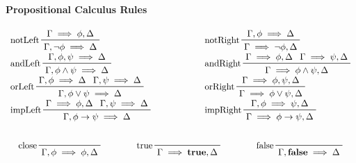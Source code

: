 \documentclass[a4paper, 11pt, accentcolor = tud3b]{tudreport}
\newcommand{\true}{\textbf{true}}
\newcommand{\false}{\textbf{false}}
\begin{document}
				\paragraph{Propositional Calculus Rules}
					\begin{gather*}
						\begin{array}{lcl}
							\prftree[l]{notLeft}{\Gamma \implies \phi, \Delta}{\Gamma, \lnot\phi \implies \Delta} &\quad\quad\quad\quad& \prftree[l]{notRight}{\Gamma, \phi \implies \Delta}{\Gamma \implies \lnot\phi, \Delta} \\
							\prftree[l]{andLeft}{\Gamma, \phi, \psi \implies \Delta}{\Gamma, \phi \land \psi \implies \Delta} && \prftree[l]{andRight}{\Gamma \implies \phi, \Delta}{\Gamma \implies \psi, \Delta}{\Gamma \implies \phi \land \psi, \Delta} \\
							\prftree[l]{orLeft}{\Gamma, \phi \implies \Delta}{\Gamma, \psi \implies \Delta}{\Gamma, \phi \lor \psi \implies \Delta} && \prftree[l]{orRight}{\Gamma \implies \phi, \psi, \Delta}{\Gamma \implies \phi \lor \psi, \Delta} \\
							\prftree[l]{impLeft}{\Gamma \implies \phi, \Delta}{\Gamma, \psi \implies \Delta}{\Gamma, \phi \to \psi \implies \Delta} && \prftree[l]{impRight}{\Gamma, \phi \implies \psi, \Delta}{\Gamma \implies \phi \to \psi, \Delta}
						\end{array} \\\\
						\prftree[l]{close}{\Gamma, \phi \implies \phi, \Delta} \quad\quad\quad\quad \prftree[l]{true}{\Gamma \implies \true, \Delta} \quad\quad\quad\quad \prftree[l]{false}{\Gamma, \false \implies \Delta}
					\end{gather*}
	
\end{document}
